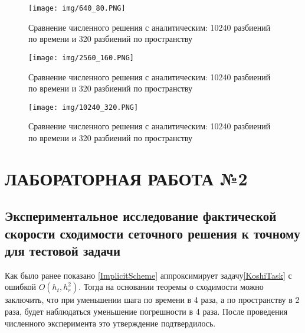 \documentclass[a4paper,12pt,russian, fleqn]{extreport}
\begin{document}
	\begin{figure}[h!]
	\begin{center}
		\texttt{[image: img/640\_80.PNG]}
\caption{Сравнение численного решения с аналитическим: 10240 разбиений по времени и 320 разбиений по пространству}
	\end{center}
	\end{figure}

	\begin{figure}[h!]
	\begin{center}
		\texttt{[image: img/2560\_160.PNG]}
\caption{Сравнение численного решения с аналитическим: 10240 разбиений по времени и 320 разбиений по пространству}
	\end{center}
	\end{figure}

	\begin{figure}[h]
	\begin{center}
	\texttt{[image: img/10240\_320.PNG]}
	\caption{Сравнение численного решения с аналитическим: 10240 разбиений по времени и 320 разбиений по пространству}
	\end{center}
	\end{figure}
	\chapter{ЛАБОРАТОРНАЯ РАБОТА №2}
	\section{Экспериментальное исследование фактической скорости сходимости сеточного решения к точному для тестовой задачи}
	Как было ранее показано \eqref{ImplicitScheme} аппроксимирует задачу\eqref{KoshiTask} с ошибкой $O(h_t, h_r^2)$. Тогда на основании теоремы о сходимости можно заключить, что при уменьшении шага по времени в 4 раза, а по пространству в 2 раза, будет наблюдаться уменьшение погрешности в 4 раза. После проведения численного эксперимента это утверждение подтвердилось.
	
\end{document}
